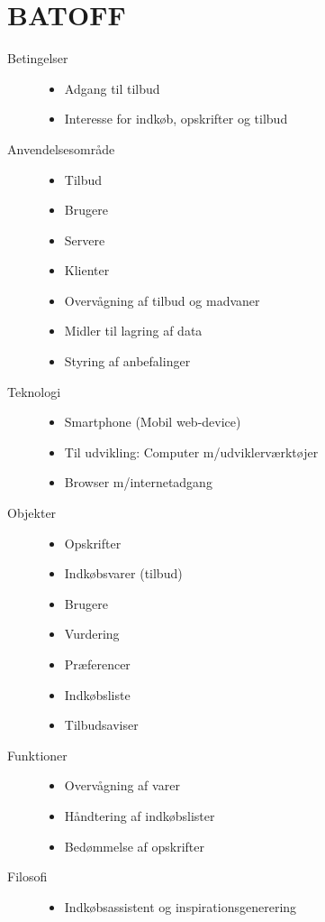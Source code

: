 \section{BATOFF}
\begin{description}
\item [Betingelser]\hfill
\begin{itemize}[nolistsep,noitemsep]
\item Adgang til tilbud
\item Interesse for indkøb, opskrifter og tilbud
\end{itemize}

\item [Anvendelsesområde]\hfill
\begin{itemize}[nolistsep,noitemsep]
\item Tilbud
\item Brugere
\item Servere
\item Klienter
\item Overvågning af tilbud og madvaner
\item Midler til lagring af data
\item Styring af anbefalinger
\end{itemize}

\item [Teknologi]\hfill
\begin{itemize}[nolistsep,noitemsep]
\item Smartphone (Mobil web-device)
\item Til udvikling: Computer m/udviklerværktøjer
\item Browser m/internetadgang
\end{itemize}

\item [Objekter]\hfill
\begin{itemize}[nolistsep,noitemsep]
\item Opskrifter
\item Indkøbsvarer (tilbud)
\item Brugere
\item Vurdering 
\item Præferencer
\item Indkøbsliste
\item Tilbudsaviser 
\end{itemize}

\item [Funktioner]\hfill
\begin{itemize}[nolistsep,noitemsep]
\item Overvågning af varer 
\item Håndtering af indkøbslister
\item Bedømmelse af opskrifter
\end{itemize}

\item [Filosofi]\hfill
\begin{itemize}[nolistsep,noitemsep]
\item Indkøbsassistent og inspirationsgenerering
\end{itemize}
\end{description}

 

